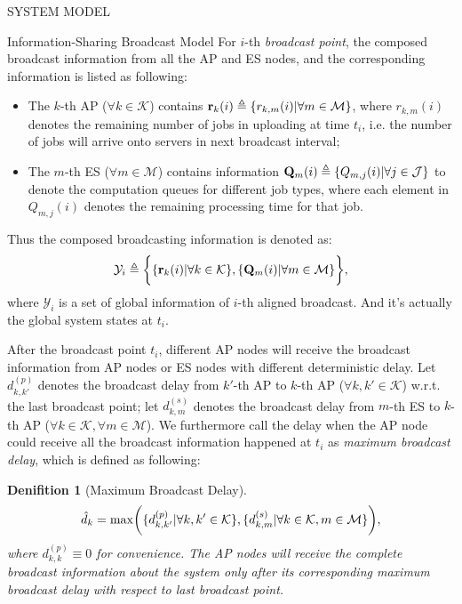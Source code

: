 \documentclass[10pt, conference, letterpaper]{IEEEtran}
\newtheorem{definition}{Denifition}
\newcommand{\define}{\triangleq}
\renewcommand{\vec}{\mathbf}
\DeclarePairedDelimiter{\set}{\{}{\}}
\DeclarePairedDelimiter{\Paren}{\bigg(}{\bigg)}
\DeclarePairedDelimiter{\Brace}{\bigg\{}{\bigg\}}
\newcommand{\apSet}{\mathcal{K}}
\newcommand{\esSet}{\mathcal{M}}
\newcommand{\jSpace}{\mathcal{J}}
\newcommand{\Obsv}{\mathcal{Y}}
\begin{document}
\begin{section}{SYSTEM MODEL}
\begin{subsection}{Information-Sharing Broadcast Model}
            For $i$-th \emph{broadcast point}, the composed broadcast information from all the AP and ES nodes, and the corresponding information is listed as following:
            \begin{itemize}
                \item The $k$-th AP ($\forall k\in\apSet$) contains $\vec{r}_k(i) \define \set{r_{k,m}(i)|\forall m\in\esSet}$, where $r_{k,m}(i)$ denotes the remaining number of jobs in uploading at time $t_i$, i.e. the number of jobs will arrive onto servers in next broadcast interval;
                \item The $m$-th ES ($\forall m\in\esSet$) contains information $\vec{Q}_m(i) \define \set{Q_{m,j}(i)|\forall j\in\jSpace}$ to denote the computation queues for different job types, where each element in $Q_{m,j}(i)$ denotes the remaining processing time for that job.
            \end{itemize}
            Thus the composed broadcasting information is denoted as:
            \begin{align}
                \Obsv_i \define
                        \Brace{
                            \set{\vec{r}_{k}(i)|\forall k\in\apSet},
                            \set{\vec{Q}_m(i)|\forall m\in\esSet}
                        },
            \end{align}
            where $\Obsv_i$ is a set of global information of $i$-th aligned broadcast. And it's actually the global system states at $t_i$.

            After the broadcast point $t_i$, different AP nodes will receive the broadcast information from AP nodes or ES nodes with different deterministic delay.
            Let $d^{(p)}_{k,k'}$ denotes the broadcast delay from $k'$-th AP to $k$-th AP ($\forall k,k'\in\apSet$) w.r.t. the last broadcast point; let $d^{(s)}_{k,m}$ denotes the broadcast delay from $m$-th ES to $k$-th AP ($\forall k\in\apSet,\forall m\in\esSet$). We furthermore call the delay when the AP node could receive all the broadcast information happened at $t_i$ as \emph{maximum broadcast delay}, which is defined as following:
            \begin{definition}[Maximum Broadcast Delay]
                \begin{align}
                    \hat{d}_k = \max \Paren{\set{d^{(p)}_{k,k'}|\forall k,k'\in\apSet}, \set{d^{(s)}_{k,m}|\forall k\in\apSet,m\in\esSet}},
                \end{align}
                where $d^{(p)}_{k,k} \equiv 0$ for convenience. The AP nodes will receive the complete broadcast information about the system only after its corresponding maximum broadcast delay with respect to last broadcast point.
            \end{definition}


\end{subsection}
\end{section}
\end{document}
